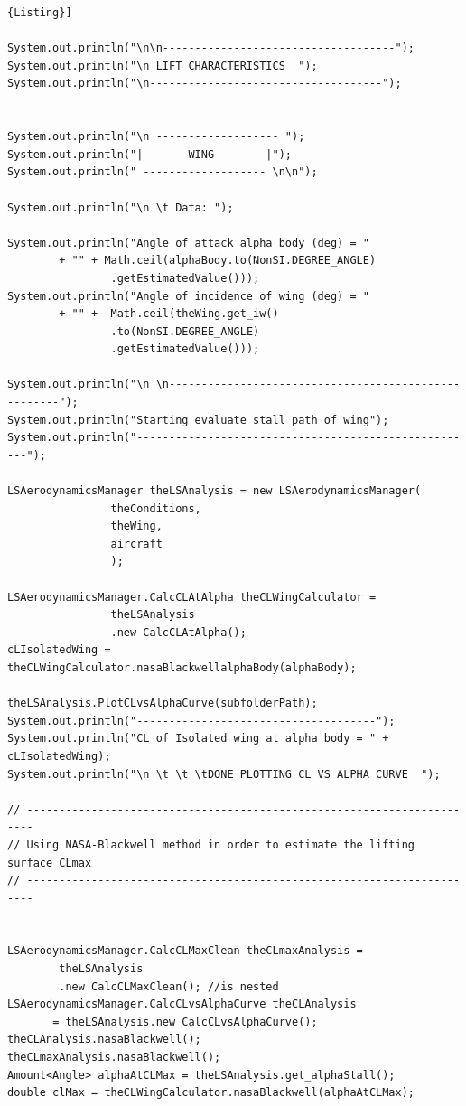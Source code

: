 \begin{lstlisting}[frame=rbl,caption={{\footnotesize Lift Characteristics of a Lifting Surface - Test Class}},label= [style=\bfseries]{Listing}]

System.out.println("\n\n------------------------------------");
System.out.println("\n LIFT CHARACTERISTICS  ");
System.out.println("\n------------------------------------");


System.out.println("\n ------------------- ");
System.out.println("|       WING        |");
System.out.println(" ------------------- \n\n");

System.out.println("\n \t Data: ");

System.out.println("Angle of attack alpha body (deg) = "
		+ "" + Math.ceil(alphaBody.to(NonSI.DEGREE_ANGLE)
				.getEstimatedValue()));
System.out.println("Angle of incidence of wing (deg) = "
		+ "" +  Math.ceil(theWing.get_iw()
				.to(NonSI.DEGREE_ANGLE)
				.getEstimatedValue()));

System.out.println("\n \n-----------------------------------------------------");
System.out.println("Starting evaluate stall path of wing");
System.out.println("-----------------------------------------------------");

LSAerodynamicsManager theLSAnalysis = new LSAerodynamicsManager(
				theConditions,
				theWing,
				aircraft
				);
				
LSAerodynamicsManager.CalcCLAtAlpha theCLWingCalculator = 
				theLSAnalysis
				.new CalcCLAtAlpha();
cLIsolatedWing = theCLWingCalculator.nasaBlackwellalphaBody(alphaBody);

theLSAnalysis.PlotCLvsAlphaCurve(subfolderPath);
System.out.println("-------------------------------------");
System.out.println("CL of Isolated wing at alpha body = " + cLIsolatedWing);
System.out.println("\n \t \t \tDONE PLOTTING CL VS ALPHA CURVE  ");

// -----------------------------------------------------------------------
// Using NASA-Blackwell method in order to estimate the lifting surface CLmax
// -----------------------------------------------------------------------


LSAerodynamicsManager.CalcCLMaxClean theCLmaxAnalysis = 
		theLSAnalysis
		.new CalcCLMaxClean(); //is nested
LSAerodynamicsManager.CalcCLvsAlphaCurve theCLAnalysis
       = theLSAnalysis.new CalcCLvsAlphaCurve();
theCLAnalysis.nasaBlackwell();
theCLmaxAnalysis.nasaBlackwell();
Amount<Angle> alphaAtCLMax = theLSAnalysis.get_alphaStall();
double clMax = theCLWingCalculator.nasaBlackwell(alphaAtCLMax);



\end{lstlisting}
